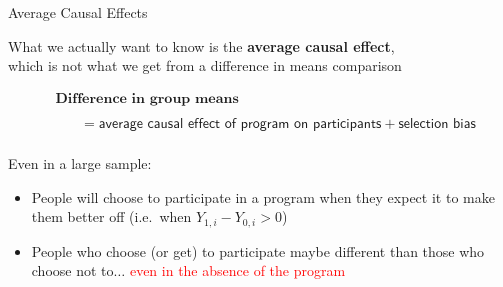 \documentclass[10pt,xcolor=table,ignorenonframetext,handout,aspectratio=169]{beamer}
\newlength{\wideitemsep}
\let\olditem\item
\renewcommand{\item}{\setlength{\itemsep}{\wideitemsep}\olditem}
\begin{document}
\begin{frame}{Average Causal Effects}

\medskip
What we actually want to know is the \textbf{average causal effect}, \\
which is not what we get from a difference in means comparison
\medskip
\begin{small}
	\begin{align*}
	&\textbf{Difference in group means} \\
	& \\
	& \ \ \ \ \ \ \ \  = \textsf{average causal effect of program on participants} + \textsf{selection bias}\\
	\end{align*}
\end{small}

\vspace{-0.5cm}

\pause
Even in a large sample:

\medskip
\begin{itemize}
	
	\item People will choose to participate in a program when they expect it to make them better off (i.e.~when $Y_{1,i} - Y_{0,i} > 0$)
	
	\item People who choose (or get) to participate maybe different than those who choose not to$\ldots$ \textcolor{red}{even in the absence of the program}
	
\end{itemize}

\end{frame}


\end{document}
